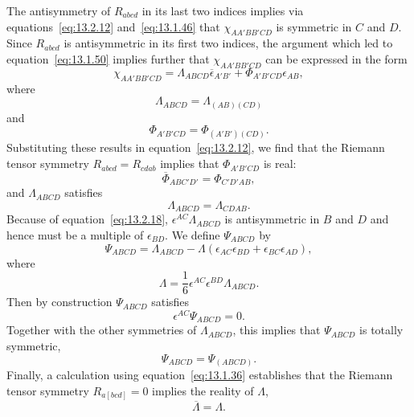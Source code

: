 The antisymmetry of \(R_{abcd}\) in its last two indices implies via
equations~\eqref{eq:13.2.12} and~\eqref{eq:13.1.46} that
\(\chi_{AA'BB'CD}\) is symmetric in \(C\) and \(D\). Since \(R_{abcd}\) is
antisymmetric in its first two indices, the argument which led to
equation~\eqref{eq:13.1.50} implies further that \(\chi_{AA'BB'CD}\) can be
expressed in the form
\begin{equation}
  \chi_{AA'BB'CD}
  =\Lambda_{ABCD}\overline\epsilon_{A'B'}
   +\Phi_{A'B'CD}\epsilon_{AB},
  \tag{13.2.14}\label{eq:13.2.14}
\end{equation}
where
\begin{equation}
  \Lambda_{ABCD}=\Lambda_{(AB)(CD)}
  \tag{13.2.15}\label{eq:13.2.15}
\end{equation}
and
\begin{equation}
  \Phi_{A'B'CD}=\Phi_{(A'B')(CD)}.
  \tag{13.2.16}\label{eq:13.2.16}
\end{equation}
Substituting these results in equation~\eqref{eq:13.2.12}, we find that the
Riemann tensor symmetry \(R_{abcd}=R_{cdab}\) implies that \(\Phi_{A'B'CD}\) is
real:
\begin{equation}
  \overline\Phi_{ABC'D'}=\Phi_{C'D'AB},
  \tag{13.2.17}\label{eq:13.2.17}
\end{equation}
and \(\Lambda_{ABCD}\) satisfies
\begin{equation}
  \Lambda_{ABCD}=\Lambda_{CDAB}.
  \tag{13.2.18}\label{eq:13.2.18}
\end{equation}
Because of equation~\eqref{eq:13.2.18},
\(\epsilon^{AC}\Lambda_{ABCD}\) is antisymmetric in \(B\) and \(D\) and hence must
be a multiple of \(\epsilon_{BD}\). We define \(\Psi_{ABCD}\) by
\begin{equation}
  \Psi_{ABCD}
  =\Lambda_{ABCD}-\Lambda(\epsilon_{AC}\epsilon_{BD}+\epsilon_{BC}\epsilon_{AD}),
  \tag{13.2.19}\label{eq:13.2.19}
\end{equation}
where
\begin{equation}
  \Lambda=\frac16\epsilon^{AC}\epsilon^{BD}\Lambda_{ABCD}.
  \tag{13.2.20}\label{eq:13.2.20}
\end{equation}
Then by construction \(\Psi_{ABCD}\) satisfies
\begin{equation}
  \epsilon^{AC}\Psi_{ABCD}=0.
  \tag{13.2.21}\label{eq:13.2.21}
\end{equation}
Together with the other symmetries of \(\Lambda_{ABCD}\), this implies that
\(\Psi_{ABCD}\) is totally symmetric,
\begin{equation}
  \Psi_{ABCD}=\Psi_{(ABCD)}.
  \tag{13.2.22}\label{eq:13.2.22}
\end{equation}
Finally, a calculation using equation~\eqref{eq:13.1.36} establishes that the
Riemann tensor symmetry \(R_{a[bcd]}=0\) implies the reality of \(\Lambda\),
\begin{equation}
  \overline\Lambda=\Lambda.
  \tag{13.2.23}\label{eq:13.2.23}
\end{equation}

